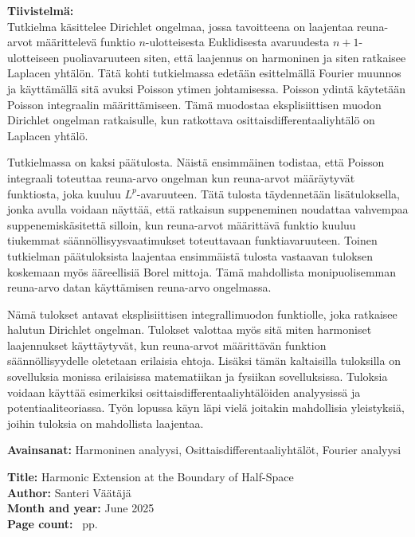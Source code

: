 \documentclass[a4paper, 11pt]{report}
\theoremstyle{plain}
\theoremstyle{definition}
\theoremstyle{remark}
\begin{document}
\noindent\textbf{Tiivistelmä:}\\ %
Tutkielma käsittelee Dirichlet ongelmaa, jossa tavoitteena on laajentaa reuna-arvot määrittelevä funktio $n$-ulotteisesta Euklidisesta avaruudesta $n+1$-ulotteiseen puoliavaruuteen siten, että laajennus on harmoninen ja siten ratkaisee Laplacen yhtälön. Tätä kohti tutkielmassa edetään esittelmällä Fourier muunnos ja käyttämällä sitä avuksi Poisson ytimen johtamisessa. Poisson ydintä käytetään Poisson integraalin määrittämiseen. Tämä muodostaa eksplisiittisen muodon Dirichlet ongelman ratkaisulle, kun ratkottava osittaisdifferentaaliyhtälö on Laplacen yhtälö.

Tutkielmassa on kaksi päätulosta. Näistä ensimmäinen todistaa, että Poisson integraali toteuttaa reuna-arvo ongelman kun reuna-arvot määräytyvät funktiosta, joka kuuluu $L^p$-avaruuteen. Tätä tulosta täydennetään lisätuloksella, jonka avulla voidaan näyttää, että ratkaisun suppeneminen noudattaa vahvempaa suppenemiskäsitettä silloin, kun reuna-arvot määrittävä funktio kuuluu tiukemmat säännöllisyysvaatimukset toteuttavaan funktiavaruuteen. Toinen tutkielman päätuloksista laajentaa ensimmäistä tulosta vastaavan tuloksen koskemaan myös ääreellisiä Borel mittoja. Tämä mahdollista monipuolisemman reuna-arvo datan käyttämisen reuna-arvo ongelmassa.

Nämä tulokset antavat eksplisiittisen integrallimuodon funktiolle, joka ratkaisee halutun Dirichlet ongelman. Tulokset valottaa myös sitä miten harmoniset laajennukset käyttäytyvät, kun reuna-arvot määrittävän funktion säännöllisyydelle oletetaan erilaisia ehtoja. Lisäksi tämän kaltaisilla tuloksilla on sovelluksia monissa erilaisissa matematiikan ja fysiikan sovelluksissa. Tuloksia voidaan käyttää esimerkiksi osittaisdifferentaaliyhtälöiden analyysissä ja potentiaaliteoriassa. Työn lopussa käyn läpi vielä joitakin mahdollisia yleistyksiä, joihin tuloksia on mahdollista laajentaa.

\vfill

\noindent\textbf{Avainsanat:} Harmoninen analyysi, Osittaisdifferentaaliyhtälöt, Fourier analyysi %

\clearpage
\noindent\textbf{Title:} Harmonic Extension at the Boundary of Half-Space\\ %
\textbf{Author:} Santeri Väätäjä\\ %
\textbf{Month and year:} June 2025\\ %
\textbf{Page count:} \pageref*{LastPage}~pp.\\[1em] %
\end{document}
